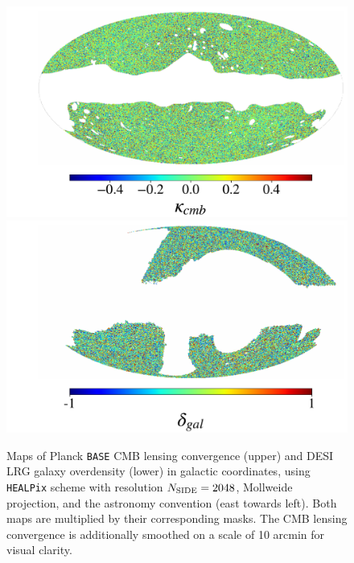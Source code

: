 \documentclass[a4paper,usenatbib]{mnras}
\begin{document}
\begin{figure}
\includegraphics[width=\linewidth]{figures/cmb_map.pdf} 
\includegraphics[width=\linewidth]{figures/gal_map.pdf}
\caption{Maps of Planck \texttt{BASE} CMB lensing convergence (upper) and DESI LRG galaxy overdensity (lower) in galactic coordinates, using \texttt{HEALPix} scheme with resolution $N_{\rm SIDE} = 2048$, Mollweide projection, and the astronomy convention (east towards left). Both maps are multiplied by their corresponding masks. The CMB lensing convergence is additionally smoothed on a scale of 10 arcmin for visual clarity.}
\label{fig:pixel_maps}
\end{figure}


\end{document}
